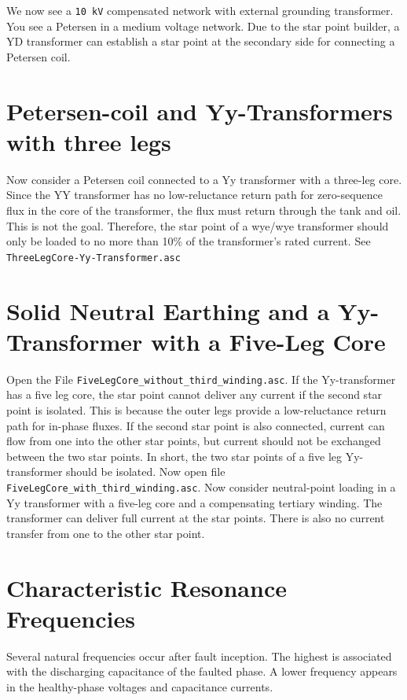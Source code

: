 We now see a \texttt{\SI{10}{\kilo\volt}} compensated network with external grounding transformer. You see a Petersen in a medium voltage network. Due to the star point builder, a YD transformer can establish a star point at the secondary side for connecting a Petersen coil. 

\section{Petersen-coil and Yy-Transformers with three legs} 

Now consider a Petersen coil connected to a Yy transformer with a three-leg core. Since the YY transformer has no low-reluctance return path for zero-sequence flux in the core of the transformer, the flux must return through the tank and oil. This is not the goal. Therefore, the star point of a wye/wye transformer should only be loaded to no more than 10\% of the transformer’s rated current. See \texttt{ThreeLegCore-Yy-Transformer.asc}

\section{Solid Neutral Earthing and a Yy-Transformer with a Five-Leg Core}
Open the File \texttt{FiveLegCore\_without\_third\_winding.asc}. If the Yy-transformer has a five leg core, the star point cannot deliver any current if the second star point is isolated. This is because the outer legs provide a low-reluctance return path for in-phase fluxes. If the second star point is also connected, current can flow from one into the other star points, but current should not be exchanged between the two star points. In short, the two star points of a five leg Yy-transformer should be isolated. Now open file \texttt{FiveLegCore\_with\_third\_winding.asc}. Now consider neutral-point loading in a Yy transformer with a five-leg core and a compensating tertiary winding. The transformer can deliver full current at the star points. There is also no current transfer from one to the other star point.

\section{Characteristic Resonance Frequencies}
\label{sec:earth-fault-resonance-frequencies}

Several natural frequencies occur after fault inception. The highest is
associated with the discharging capacitance of the faulted phase. A lower
frequency appears in the healthy-phase voltages and capacitance currents.



